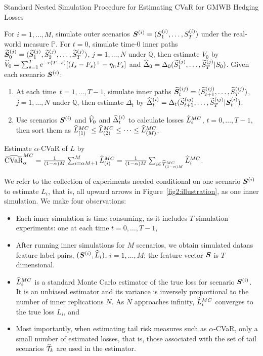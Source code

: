 \begin{algorithm} 
\caption{Standard Nested Simulation Procedure for Estimating CVaR for GMWB Hedging Losses}
\begin{algorithmic}[1] \label{alg2:standardProcedure}
    \STATE  For $i=1,\ldots,M$, simulate outer scenarios $\bm{S}^{(i)} = (S_{1}^{(i)},\ldots,S_{T}^{(i)})$ under the real-world measure $\mathbb{P}$.
    \STATE  For $t=0$, simulate time-$0$ inner paths $\widetilde{\bm{S}}_{0}^{(j)} = (\widetilde{S}_{1}^{(j)},\widetilde{S}_{2}^{(j)},\ldots,\widetilde{S}_{T}^{(j)})$, $j=1,\ldots,N$ under $\mathbb{Q}$, then estimate $V_0$ by $\widehat{V}_0 = \sum_{s=1}^{T} e^{-r(T-s)} [(I_s - F_s)^+- \eta_n F_s]$ and $\widehat{\Delta}_0 = \Delta_0(\widetilde{S}_{1}^{(j)},\ldots,\widetilde{S}_{T}^{(j)} | S_0)$.
    \STATE  Given each scenario $\bm{S}^{(i)}$:
    \begin{enumerate}[label=\alph*., itemsep=0pt, parsep=0pt, topsep=0pt]
        \item   At each time~$t=1,\ldots,T-1$, simulate inner paths $\widetilde{\bm{S}}_{t}^{(ij)} = (\widetilde{S}_{t+1}^{(ij)},\ldots,\widetilde{S}_{T}^{(ij)})$, $j=1,\ldots,N$ under $\mathbb{Q}$, then estimate $\Delta_t$ by $\widehat{\Delta}_t^{(i)} = \Delta_t(\widetilde{S}_{t+1}^{(ij)},\ldots,\widetilde{S}_{T}^{(ij)} | \bm{S}_t^{(i)})$.
        \item   Use scenarios $\bm{S}^{(i)}$ and $\widehat{V}_0$ and $\widehat{\Delta}_t^{(i)}$ to calculate losses $\widehat{L}_i^{MC}$, $t=0,\ldots,T-1$, then sort them as $\widehat{L}^{MC}_{(1)}\leq \widehat{L}^{MC}_{(2)} \leq \cdots\leq \widehat{L}^{MC}_{(M)}$.
    \end{enumerate}
    \STATE  Estimate $\alpha$-CVaR of $L$ by $\widehat{\mbox{CVaR}}^{MC}_\alpha = \frac{1}{(1-\alpha)M} \sum_{i=\alpha M + 1}^{M}\widehat{L}_{(i)}^{MC} = \frac{1}{(1-\alpha)M} \sum_{i \in \widehat{\mathcal{T}}_{(1-\alpha )M}^{MC}}\widehat{L}_{i}^{MC}$.
\end{algorithmic}
\end{algorithm}

We refer to the collection of experiments needed conditional on one scenario $\bm{S}^{(i)}$ to estimate $L_i$, that is, all upward arrows in Figure~\ref{fig2:illustration}, as one inner simulation.
We make four observations:
\begin{itemize}
    \item   Each inner simulation is time-consuming, as it includes $T$ simulation experiments: one at each time $t=0,\ldots,T-1$,
    \item   After running inner simulations for $M$ scenarios, we obtain simulated dataas feature-label pairs, $(\bm{S}^{(i)}, \widehat{L}_i)$, $i=1,\ldots,M$; the feature vector $\bm{S}$ is $T$ dimensional.
    \item   $\widehat{L}_i^{MC}$ is a standard Monte Carlo estimator of the true loss for scenario $\bm{S}^{(i)}$. 
    It is an unbiased estimator and its variance is inversely proportional to the number of inner replications $N$. 
    As $N$ approaches infinity, $\widehat{L}_i^{MC}$ converges to the true loss $L_i$, and
    \item   Most importantly, when estimating tail risk measures such as $\alpha$-CVaR, only a small number of estimated losses, that is, those associated with the set of tail scenarios $\widehat{\mathcal{T}}_{k}$ are used in the estimator.
\end{itemize}

